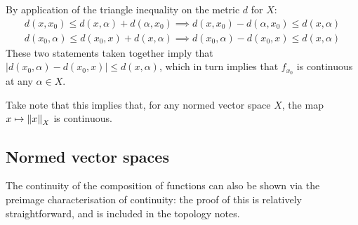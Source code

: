 \begin{bproof}{}{}
By application of the triangle inequality on the metric $d$ for $X$:
\begin{equation}
    \begin{gathered}
    d(x,x_{0}) \leq d(x,\alpha) + d(\alpha, x_{0}) \implies d(x,x_{0}) -  d(\alpha, x_{0}) \leq d(x,\alpha) \\
    d(x_{0},\alpha) \leq d(x_{0},x) + d(x, \alpha) \implies d(x_{0},\alpha) - d(x_{0},x)  \leq  d(x, \alpha) 
    \end{gathered}
\end{equation}
These two statements taken together imply that \mbox{$|d(x_{0},\alpha) - d(x_{0},x)| \leq d(x, \alpha)$}, which in turn implies that $f_{x_{0}}$ is continuous at any $\alpha\in X$.
\eop
\end{bproof}
Take note that this implies that, for any normed vector space $X$, the map \mbox{$x\mapsto\left\lVert x \right\rVert_{X}$} is continuous.

\subsection{Normed vector spaces}
The continuity of the composition of functions can also be shown via the preimage characterisation of continuity: the proof of this is relatively straightforward, and is included in the topology notes.

